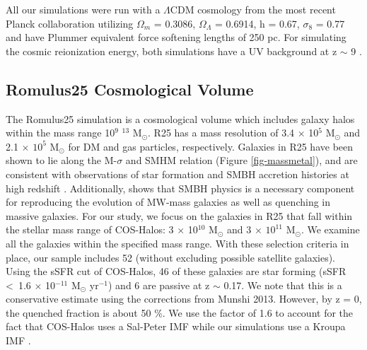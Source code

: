 \documentclass[]{emulateapj}
\begin{document}
All our simulations were run with a $\Lambda$CDM cosmology from the most recent Planck collaboration utilizing $\Omega_m$ = 0.3086, $\Omega _{\Lambda}$ = 0.6914, h = 0.67, $\sigma_8$ = 0.77 and have Plummer equivalent force softening lengths of 250 pc. For simulating the cosmic reionization energy, both simulations have a UV background at z $\sim$ 9 \citep{Haardt2012}.

\subsection{{\sc Romulus25}  Cosmological Volume}
The {\sc Romulus25}  \citep[][R25]{Tremmel2017} simulation is a cosmological volume which includes galaxy halos within the mass range 10$^{9}$ $^{13}$ M$_{\odot}$. R25 has a mass resolution of 3.4 $\times$ 10$^5$ M$_{\odot}$ and 2.1 $\times$ $10^5$ M$_{\odot}$ for DM and gas particles, respectively. Galaxies in R25 have been shown to lie along the M-$\sigma$ and SMHM relation (Figure \ref{fig-massmetal}), and are consistent with observations of star formation and SMBH accretion histories at high redshift \citep{Tremmel2015}. Additionally, \cite{Tremmel2015} shows that SMBH physics is a necessary component for reproducing the evolution of MW-mass galaxies as well as quenching in massive galaxies. For our study, we focus on the galaxies in R25 that fall within the stellar mass range of COS-Halos: 3 $\times$ 10$^{10}$ M$_{\odot}$ and 3 $\times$ $10^{11}$ M$_{\odot}$. We examine all the galaxies within the specified mass range. %
With these selection criteria in place, our sample includes 52 (without excluding possible satellite galaxies). Using the sSFR cut of COS-Halos, 46 of these galaxies are star forming (sSFR \textless \ 1.6 $\times$  10$^{-11}$ M$_{\odot}$  yr$^{-1}$) and 6 are passive at z $\sim$ 0.17. We note that this is a conservative estimate using the corrections from {Munshi 2013}. However, by z = 0, the quenched fraction is about 50 \%. We use the factor of 1.6 to account for the fact that COS-Halos uses a Sal-Peter IMF while our simulations use a Kroupa IMF \citep{Kroupa1993}.
\end{document}
